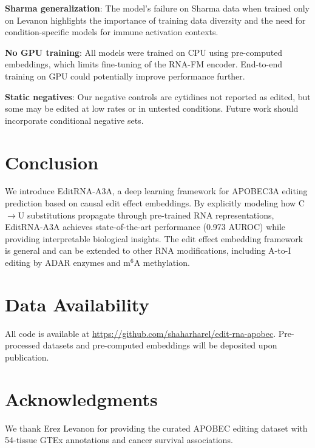 \documentclass[11pt]{article}
\begin{document}
\textbf{Sharma generalization}: The model's failure on Sharma data when trained
only on Levanon highlights the importance of training data diversity and the
need for condition-specific models for immune activation contexts.

\textbf{No GPU training}: All models were trained on CPU using pre-computed
embeddings, which limits fine-tuning of the RNA-FM encoder. End-to-end training
on GPU could potentially improve performance further.

\textbf{Static negatives}: Our negative controls are cytidines not reported as
edited, but some may be edited at low rates or in untested conditions. Future
work should incorporate conditional negative sets.

\section{Conclusion}

We introduce EditRNA-A3A, a deep learning framework for APOBEC3A editing
prediction based on causal edit effect embeddings. By explicitly modeling how
C$\to$U substitutions propagate through pre-trained RNA representations,
EditRNA-A3A achieves state-of-the-art performance (0.973 AUROC) while providing
interpretable biological insights. The edit effect embedding framework is
general and can be extended to other RNA modifications, including A-to-I editing
by ADAR enzymes and m$^6$A methylation.

\section*{Data Availability}

All code is available at \url{https://github.com/shaharharel/edit-rna-apobec}.
Pre-processed datasets and pre-computed embeddings will be deposited upon
publication.

\section*{Acknowledgments}

We thank Erez Levanon for providing the curated APOBEC editing dataset with
54-tissue GTEx annotations and cancer survival associations.



\end{document}
